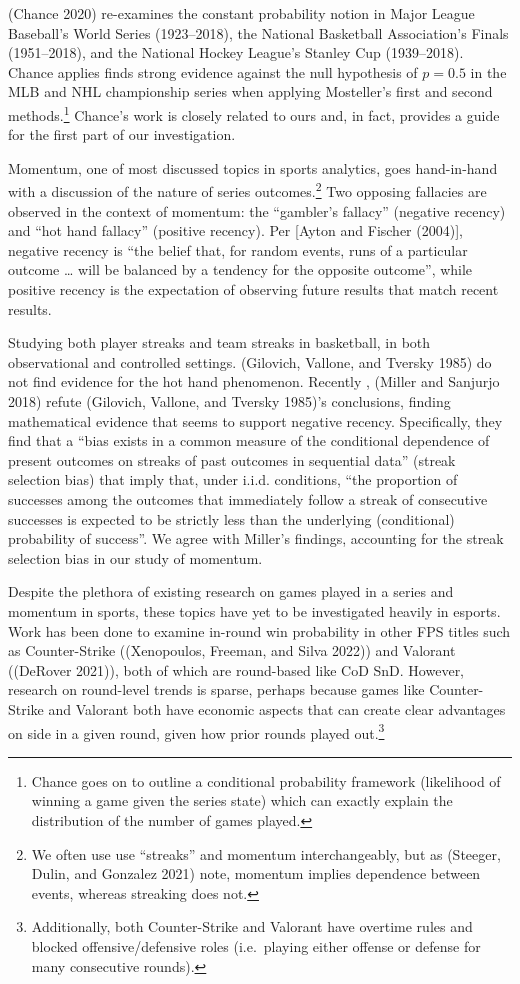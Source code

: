 \documentclass[
]{article}
\begin{document}
(Chance 2020) re-examines the constant probability notion in Major
League Baseball's World Series (1923--2018), the National Basketball
Association's Finals (1951--2018), and the National Hockey League's
Stanley Cup (1939--2018). Chance applies finds strong evidence against
the null hypothesis of \(p = 0.5\) in the MLB and NHL championship
series when applying Mosteller's first and second methods.\footnote{Chance
  goes on to outline a conditional probability framework (likelihood of
  winning a game given the series state) which can exactly explain the
  distribution of the number of games played.} Chance's work is closely
related to ours and, in fact, provides a guide for the first part of our
investigation.

Momentum, one of most discussed topics in sports analytics, goes
hand-in-hand with a discussion of the nature of series
outcomes.\footnote{We often use use ``streaks'' and momentum
  interchangeably, but as (Steeger, Dulin, and Gonzalez 2021) note,
  momentum implies dependence between events, whereas streaking does
  not.} Two opposing fallacies are observed in the context of momentum:
the ``gambler's fallacy'' (negative recency) and ``hot hand fallacy''
(positive recency). Per {[}Ayton and Fischer (2004){]}, negative recency
is ``the belief that, for random events, runs of a particular outcome
\ldots{} will be balanced by a tendency for the opposite outcome'',
while positive recency is the expectation of observing future results
that match recent results.

Studying both player streaks and team streaks in basketball, in both
observational and controlled settings. (Gilovich, Vallone, and Tversky
1985) do not find evidence for the hot hand phenomenon. Recently ,
(Miller and Sanjurjo 2018) refute (Gilovich, Vallone, and Tversky
1985)'s conclusions, finding mathematical evidence that seems to support
negative recency. Specifically, they find that a ``bias exists in a
common measure of the conditional dependence of present outcomes on
streaks of past outcomes in sequential data'' (streak selection bias)
that imply that, under i.i.d. conditions, ``the proportion of successes
among the outcomes that immediately follow a streak of consecutive
successes is expected to be strictly less than the underlying
(conditional) probability of success''. We agree with Miller's findings,
accounting for the streak selection bias in our study of momentum.

Despite the plethora of existing research on games played in a series
and momentum in sports, these topics have yet to be investigated heavily
in esports. Work has been done to examine in-round win probability in
other FPS titles such as Counter-Strike ((Xenopoulos, Freeman, and Silva
2022)) and Valorant ((DeRover 2021)), both of which are round-based like
CoD SnD. However, research on round-level trends is sparse, perhaps
because games like Counter-Strike and Valorant both have economic
aspects that can create clear advantages on side in a given round, given
how prior rounds played out.\footnote{Additionally, both Counter-Strike
  and Valorant have overtime rules and blocked offensive/defensive roles
  (i.e.~playing either offense or defense for many consecutive rounds).}
\end{document}
